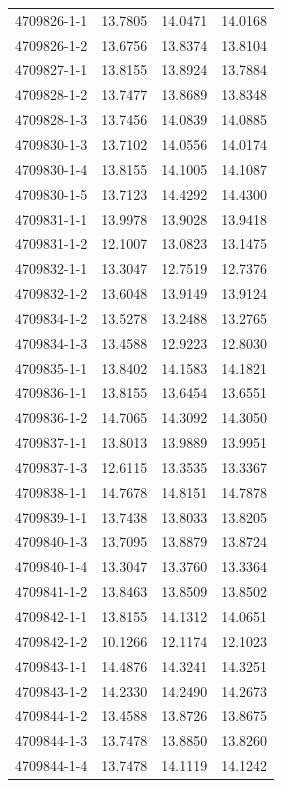 \begin{longtable}{lrrr}
4709826-1-1 & 13.7805 & 14.0471 & 14.0168 \\
4709826-1-2 & 13.6756 & 13.8374 & 13.8104 \\
4709827-1-1 & 13.8155 & 13.8924 & 13.7884 \\
4709828-1-2 & 13.7477 & 13.8689 & 13.8348 \\
4709828-1-3 & 13.7456 & 14.0839 & 14.0885 \\
4709830-1-3 & 13.7102 & 14.0556 & 14.0174 \\
4709830-1-4 & 13.8155 & 14.1005 & 14.1087 \\
4709830-1-5 & 13.7123 & 14.4292 & 14.4300 \\
4709831-1-1 & 13.9978 & 13.9028 & 13.9418 \\
4709831-1-2 & 12.1007 & 13.0823 & 13.1475 \\
4709832-1-1 & 13.3047 & 12.7519 & 12.7376 \\
4709832-1-2 & 13.6048 & 13.9149 & 13.9124 \\
4709834-1-2 & 13.5278 & 13.2488 & 13.2765 \\
4709834-1-3 & 13.4588 & 12.9223 & 12.8030 \\
4709835-1-1 & 13.8402 & 14.1583 & 14.1821 \\
4709836-1-1 & 13.8155 & 13.6454 & 13.6551 \\
4709836-1-2 & 14.7065 & 14.3092 & 14.3050 \\
4709837-1-1 & 13.8013 & 13.9889 & 13.9951 \\
4709837-1-3 & 12.6115 & 13.3535 & 13.3367 \\
4709838-1-1 & 14.7678 & 14.8151 & 14.7878 \\
4709839-1-1 & 13.7438 & 13.8033 & 13.8205 \\
4709840-1-3 & 13.7095 & 13.8879 & 13.8724 \\
4709840-1-4 & 13.3047 & 13.3760 & 13.3364 \\
4709841-1-2 & 13.8463 & 13.8509 & 13.8502 \\
4709842-1-1 & 13.8155 & 14.1312 & 14.0651 \\
4709842-1-2 & 10.1266 & 12.1174 & 12.1023 \\
4709843-1-1 & 14.4876 & 14.3241 & 14.3251 \\
4709843-1-2 & 14.2330 & 14.2490 & 14.2673 \\
4709844-1-2 & 13.4588 & 13.8726 & 13.8675 \\
4709844-1-3 & 13.7478 & 13.8850 & 13.8260 \\
4709844-1-4 & 13.7478 & 14.1119 & 14.1242 \\

\end{longtable}
